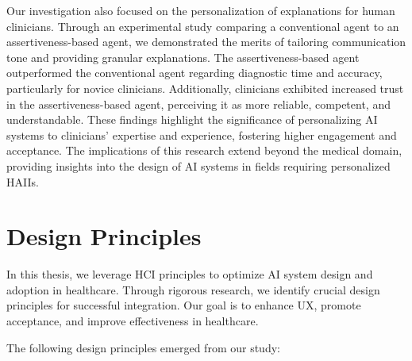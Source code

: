 Our investigation also focused on the personalization of explanations for human clinicians.
Through an experimental study comparing a conventional agent to an assertiveness-based agent, we demonstrated the merits of tailoring communication tone and providing granular explanations.
The assertiveness-based agent outperformed the conventional agent regarding diagnostic time and accuracy, particularly for novice clinicians.
Additionally, clinicians exhibited increased trust in the assertiveness-based agent, perceiving it as more reliable, competent, and understandable.
These findings highlight the significance of personalizing \ac{AI} systems to clinicians' expertise and experience, fostering higher engagement and acceptance.
The implications of this research extend beyond the medical domain, providing insights into the design of \ac{AI} systems in fields requiring personalized \acp{HAII}.

\section{Design Principles}
\label{sec:chap008002}

In this thesis, we leverage \ac{HCI} principles to optimize \ac{AI} system design and adoption in healthcare.
Through rigorous research, we identify crucial design principles for successful integration.
Our goal is to enhance \ac{UX}, promote acceptance, and improve effectiveness in healthcare.

\vspace{2.00mm}

\noindent
The following design principles emerged from our study:

\vspace{0.05mm}

